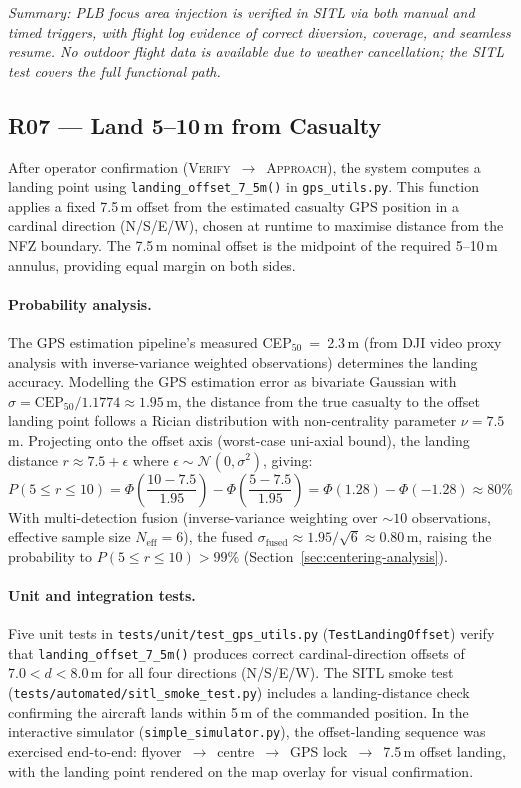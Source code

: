 \noindent\textit{Summary: PLB focus area injection is verified in SITL via both manual and timed triggers, with flight log evidence of correct diversion, coverage, and seamless resume. No outdoor flight data is available due to weather cancellation; the SITL test covers the full functional path.}

\subsection{R07 --- Land 5--10\,m from Casualty}

After operator confirmation (\textsc{Verify}~$\rightarrow$~\textsc{Approach}), the system computes a landing point using \texttt{landing\_offset\_7\_5m()} in \texttt{gps\_utils.py}. This function applies a fixed 7.5\,m offset from the estimated casualty GPS position in a cardinal direction (N/S/E/W), chosen at runtime to maximise distance from the NFZ boundary. The 7.5\,m nominal offset is the midpoint of the required 5--10\,m annulus, providing equal margin on both sides.

\paragraph{Probability analysis.} The GPS estimation pipeline's measured CEP$_{50}$~=~2.3\,m (from DJI video proxy analysis with inverse-variance weighted observations) determines the landing accuracy. Modelling the GPS estimation error as bivariate Gaussian with $\sigma = \text{CEP}_{50} / 1.1774 \approx 1.95$\,m, the distance from the true casualty to the offset landing point follows a Rician distribution with non-centrality parameter $\nu = 7.5$\,m. Projecting onto the offset axis (worst-case uni-axial bound), the landing distance $r \approx 7.5 + \epsilon$ where $\epsilon \sim \mathcal{N}(0, \sigma^2)$, giving:
\[
    P(5 \leq r \leq 10) = \Phi\!\left(\frac{10 - 7.5}{1.95}\right) - \Phi\!\left(\frac{5 - 7.5}{1.95}\right) = \Phi(1.28) - \Phi(-1.28) \approx 80\%
\]
With multi-detection fusion (inverse-variance weighting over ${\sim}10$ observations, effective sample size $N_\text{eff} = 6$), the fused $\sigma_\text{fused} \approx 1.95 / \sqrt{6} \approx 0.80$\,m, raising the probability to $P(5 \leq r \leq 10) > 99\%$ (Section~\ref{sec:centering-analysis}).

\paragraph{Unit and integration tests.} Five unit tests in \texttt{tests/unit/test\_gps\_utils.py} (\texttt{TestLandingOffset}) verify that \texttt{landing\_offset\_7\_5m()} produces correct cardinal-direction offsets of $7.0 < d < 8.0$\,m for all four directions (N/S/E/W). The SITL smoke test (\texttt{tests/automated/sitl\_smoke\_test.py}) includes a landing-distance check confirming the aircraft lands within 5\,m of the commanded position. In the interactive simulator (\texttt{simple\_simulator.py}), the offset-landing sequence was exercised end-to-end: flyover~$\rightarrow$~centre~$\rightarrow$~GPS lock~$\rightarrow$~7.5\,m offset landing, with the landing point rendered on the map overlay for visual confirmation.

